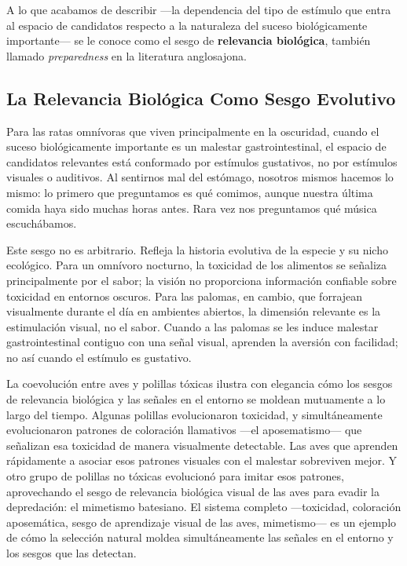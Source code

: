 \documentclass[
  letterpaper,
  DIV=11,
  numbers=noendperiod]{scrreprt}
\begin{document}
\begin{tcolorbox}[enhanced jigsaw, toprule=.15mm, arc=.35mm, colback=white, opacityback=0, colframe=quarto-callout-note-color-frame, breakable, rightrule=.15mm, left=2mm, leftrule=.75mm, bottomrule=.15mm]
A lo que acabamos de describir ---la dependencia del tipo de estímulo
que entra al espacio de candidatos respecto a la naturaleza del suceso
biológicamente importante--- se le conoce como el sesgo de
\textbf{relevancia biológica}, también llamado \emph{preparedness} en la
literatura anglosajona.

\subsection{La Relevancia Biológica Como Sesgo
Evolutivo}\label{la-relevancia-bioluxf3gica-como-sesgo-evolutivo}

Para las ratas omnívoras que viven principalmente en la oscuridad,
cuando el suceso biológicamente importante es un malestar
gastrointestinal, el espacio de candidatos relevantes está conformado
por estímulos gustativos, no por estímulos visuales o auditivos. Al
sentirnos mal del estómago, nosotros mismos hacemos lo mismo: lo primero
que preguntamos es qué comimos, aunque nuestra última comida haya sido
muchas horas antes. Rara vez nos preguntamos qué música escuchábamos.

Este sesgo no es arbitrario. Refleja la historia evolutiva de la especie
y su nicho ecológico. Para un omnívoro nocturno, la toxicidad de los
alimentos se señaliza principalmente por el sabor; la visión no
proporciona información confiable sobre toxicidad en entornos oscuros.
Para las palomas, en cambio, que forrajean visualmente durante el día en
ambientes abiertos, la dimensión relevante es la estimulación visual, no
el sabor. Cuando a las palomas se les induce malestar gastrointestinal
contiguo con una señal visual, aprenden la aversión con facilidad; no
así cuando el estímulo es gustativo.

La coevolución entre aves y polillas tóxicas ilustra con elegancia cómo
los sesgos de relevancia biológica y las señales en el entorno se
moldean mutuamente a lo largo del tiempo. Algunas polillas evolucionaron
toxicidad, y simultáneamente evolucionaron patrones de coloración
llamativos ---el aposematismo--- que señalizan esa toxicidad de manera
visualmente detectable. Las aves que aprenden rápidamente a asociar esos
patrones visuales con el malestar sobreviven mejor. Y otro grupo de
polillas no tóxicas evolucionó para imitar esos patrones, aprovechando
el sesgo de relevancia biológica visual de las aves para evadir la
depredación: el mimetismo batesiano. El sistema completo ---toxicidad,
coloración aposemática, sesgo de aprendizaje visual de las aves,
mimetismo--- es un ejemplo de cómo la selección natural moldea
simultáneamente las señales en el entorno y los sesgos que las detectan.


\end{tcolorbox}
\end{document}
